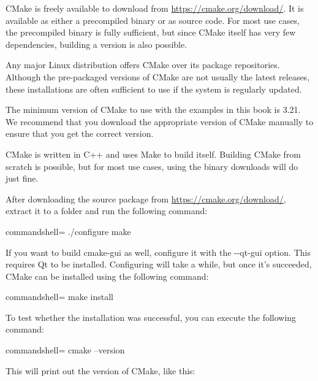 CMake is freely available to download from \url{https://cmake.org/download/}. It is available as either a precompiled binary or as source code. For most use cases, the precompiled binary is fully sufficient, but since CMake itself has very few dependencies, building a version is also possible.

Any major Linux distribution offers CMake over its package repositories. Although the pre-packaged versions of CMake are not usually the latest releases, these installations are often sufficient to use if the system is regularly updated.

\begin{tcolorbox}[colback=webgreen!5!white,colframe=webgreen!75!black,title=Note]
The minimum version of CMake to use with the examples in this book is 3.21. We recommend that you download the appropriate version of CMake manually to ensure that you get the correct version.
\end{tcolorbox}


CMake is written in C++ and uses Make to build itself. Building CMake from scratch is possible, but for most use cases, using the binary downloads will do just fine.

After downloading the source package from \url{https://cmake.org/download/}, extract it to a folder and run the following command:

\begin{tcblisting}{commandshell={}}
./configure make
\end{tcblisting}

If you want to build cmake-gui as well, configure it with the -{}-qt-gui option. This requires Qt to be installed. Configuring will take a while, but once it's succeeded, CMake can be installed using the following command:

\begin{tcblisting}{commandshell={}}
make install
\end{tcblisting}

To test whether the installation was successful, you can execute the following command:

\begin{tcblisting}{commandshell={}}
cmake --version
\end{tcblisting}

This will print out the version of CMake, like this:

